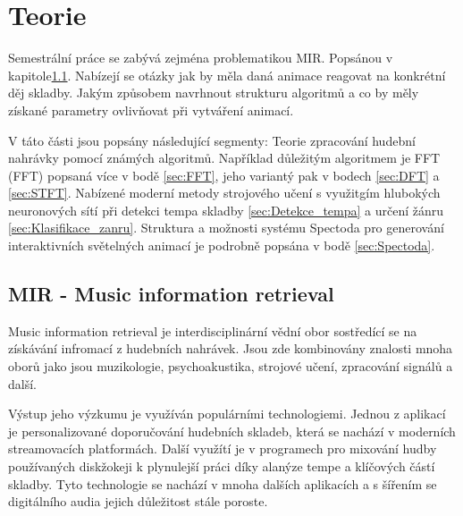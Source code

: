 \chapter{Teorie}

Semestrální práce se zabývá zejména problematikou \acs{MIR}. Popsánou v kapitole\ref{sec:MIR}.
Nabízejí se otázky jak by měla daná animace reagovat na konkrétní děj skladby.
Jakým způsobem navrhnout strukturu algoritmů a co by měly získané parametry ovlivňovat při vytváření animací.

V táto části jsou popsány následující segmenty: Teorie zpracování hudební nahrávky pomocí známých algoritmů. Například důležitým algoritmem je \acs{FFT} (\acl{FFT})
popsaná více v bodě \ref{sec:FFT}, jeho variantý pak v bodech \ref{sec:DFT} a \ref{sec:STFT}.
Nabízené moderní metody strojového učení s využitgím hlubokých neuronových sítí při detekci tempa skladby \ref{sec:Detekce_tempa} a určení žánru \ref{sec:Klasifikace_zanru}.  
Struktura a možnosti systému Spectoda pro generování interaktivních světelných animací je podrobně popsána v bodě \ref{sec:Spectoda}.

\section{MIR - Music information retrieval} \label{sec:MIR}
    Music information retrieval je interdisciplinární vědní obor sostředící se na získávání infromací z hudebních nahrávek.
    Jsou zde kombinovány znalosti mnoha oborů jako jsou muzikologie, psychoakustika, strojové učení, zpracování signálů a další. 
    

    Výstup jeho výzkumu je využíván populárními technologiemi. 
    Jednou z aplikací je personalizované doporučování hudebních skladeb, která se nachází v moderních streamovacích platformách.
    Další využítí je v programech pro mixování hudby používaných diskžokeji k plynulejší práci díky alanýze tempe a klíčových částí skladby.
    Tyto technologie se nachází v mnoha dalších aplikacích a s šířením se digitálního audia jejich důležitost stále poroste.
    \cite{lidy09:448[TUW-181186]}\cite{a_new_companion_to_digital_humanities}
    
